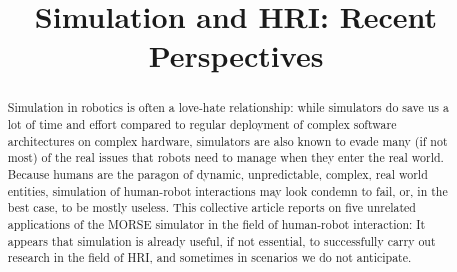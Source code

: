 \documentclass[conference]{IEEEtran}
\begin{document}
\title{Simulation and HRI: Recent Perspectives}

\author{}


\maketitle

\begin{abstract}

Simulation in robotics is often a love-hate relationship: while simulators do
save us a lot of time and effort compared to regular deployment of complex
software architectures on complex hardware, simulators are also known to evade
many (if not most) of the real issues that robots need to manage when they enter
the real world.  Because humans are the paragon of dynamic, unpredictable,
complex, real world entities, simulation of human-robot interactions may look
condemn to fail, or, in the best case, to be mostly useless.  This collective
article reports on five unrelated applications of the MORSE simulator in the
field of human-robot interaction: It appears that simulation is already useful,
if not essential, to successfully carry out research in the field of HRI, and
sometimes in scenarios we do not anticipate.

\end{abstract}
\end{document}
